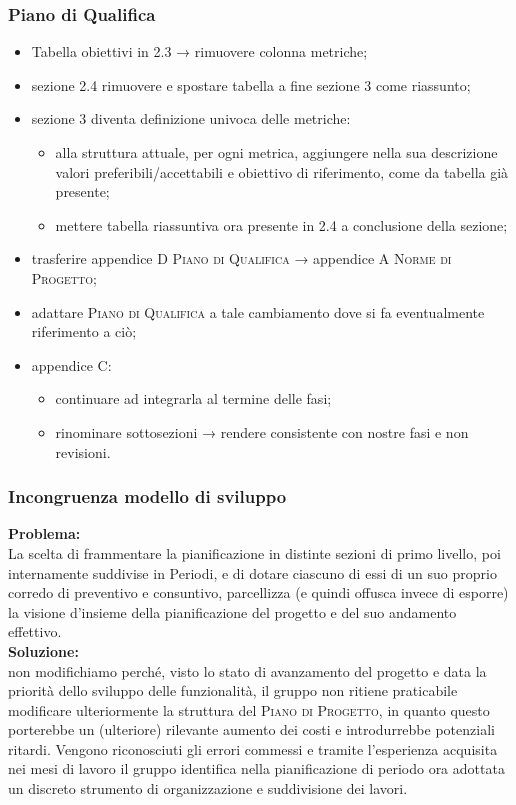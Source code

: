 \subsubsection{Piano di Qualifica}
\begin{itemize}
	\item Tabella obiettivi in 2.3 → rimuovere colonna metriche;
	
	\item sezione 2.4 rimuovere e spostare tabella a fine sezione 3 come riassunto;
	
	\item sezione 3 diventa definizione univoca delle metriche:
	\begin{itemize}
		\item alla struttura attuale, per ogni metrica, aggiungere nella sua descrizione valori preferibili/accettabili e obiettivo di riferimento, come da tabella già presente;
		\item mettere tabella riassuntiva ora presente in 2.4 a conclusione della sezione;
	\end{itemize}
	\item trasferire appendice D \textsc{Piano di Qualifica} → appendice A \textsc{Norme di Progetto};
	
	\item adattare \textsc{Piano di Qualifica} a tale cambiamento dove si fa eventualmente riferimento a ciò;
	
	\item appendice C:
	\begin{itemize}
		\item continuare ad integrarla al termine delle fasi;
		
		\item rinominare sottosezioni → rendere consistente con nostre fasi e non revisioni.
	\end{itemize}
	
\end{itemize}

\subsubsection{Incongruenza modello di sviluppo}
\textbf{Problema:}\\
La scelta di frammentare la pianificazione in distinte sezioni di primo livello, poi internamente suddivise in Periodi, e di dotare ciascuno di essi di un suo proprio corredo di preventivo e consuntivo, parcellizza (e quindi offusca invece di esporre) la visione d’insieme della pianificazione del progetto e del suo andamento effettivo.\\
\textbf{Soluzione:}\\
non modifichiamo perché, visto lo stato di avanzamento del progetto e data la priorità dello sviluppo delle funzionalità, il gruppo non ritiene praticabile modificare ulteriormente la struttura del \textsc{Piano di Progetto}, in quanto questo porterebbe un (ulteriore) rilevante aumento dei costi e introdurrebbe potenziali ritardi. Vengono riconosciuti gli errori commessi e tramite l’esperienza acquisita nei mesi di lavoro il gruppo identifica nella pianificazione di periodo ora adottata un discreto strumento di organizzazione e suddivisione dei lavori. 

